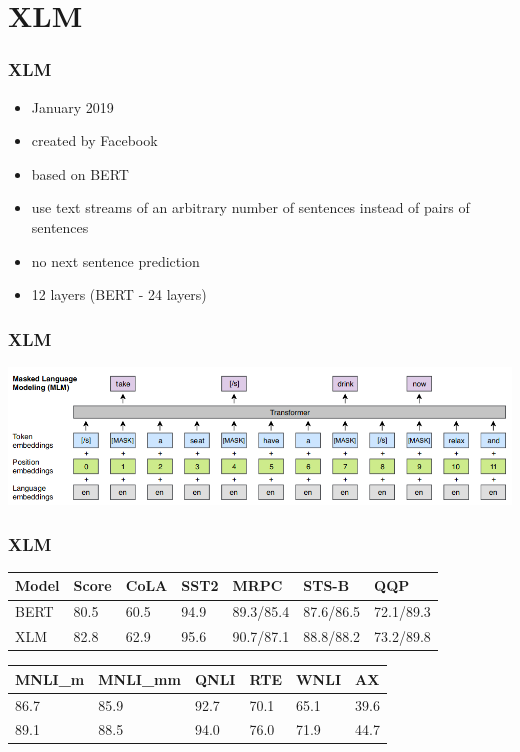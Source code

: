 \documentclass{beamer}
\begin{document}
\section{XLM}
\begin{frame}
    \frametitle{XLM \cite{xlm}}
    \begin{itemize}
        \item January 2019
        \item created by Facebook
        \item based on BERT
        \item use text streams of an arbitrary number of sentences instead of pairs of sentences
        \item no next sentence prediction
        \item 12 layers (BERT - 24 layers)
    \end{itemize}
\end{frame}

\begin{frame}
    \frametitle{XLM}
    \begin{center}
        \includegraphics[scale=1.35]{img/xlm.png}
    \end{center}
\end{frame}

\begin{frame}
    \frametitle{XLM}
    \begin{center}
    	\begin{tabular}{l | l | l | l | l | l | l}
    	    \textbf{Model} & \textbf{Score} & \textbf{CoLA} & \textbf{SST2} & \textbf{MRPC} & \textbf{STS-B} & \textbf{QQP} \\
    	    \hline
    	    BERT & 80.5 & 60.5 & 94.9 & 89.3/85.4 & 87.6/86.5 & 72.1/89.3 \\
    	    XLM & 82.8 & 62.9 & 95.6 & 90.7/87.1 & 88.8/88.2 & 73.2/89.8 \\
    	\end{tabular}
    	
    	\begin{tabular}{l | l | l | l | l | l}
    	\textbf{MNLI\_m} & \textbf{MNLI\_mm} & \textbf{QNLI} & \textbf{RTE} & \textbf{WNLI} & \textbf{AX} \\
    	    \hline
    	86.7 & 85.9 & 92.7 & 70.1 & 65.1 & 39.6 \\
    	89.1 & 88.5 & 94.0 & 76.0 & 71.9 & 44.7 \\
    	\end{tabular}
    \end{center}
\end{frame}
\end{document}
